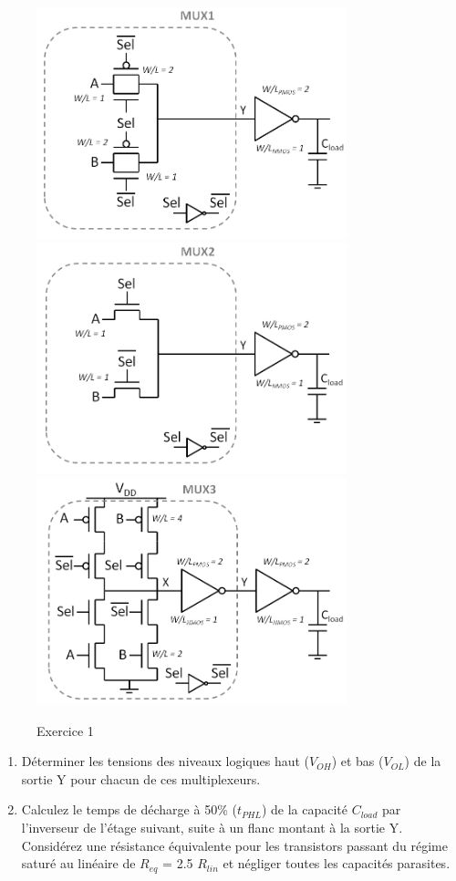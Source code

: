 \begin{figure}[!htbp]
   \centering
   \includegraphics[width=9cm]{figure/fig7-3-1.png}
	 \includegraphics[width=9cm]{figure/fig7-3-2.png}
	 \includegraphics[width=9cm]{figure/fig7-3-3.png}
   \caption{Exercice 1}
   \label{fig7-3}
\end{figure}

\begin{enumerate}
	\item Déterminer les tensions des niveaux logiques haut ($V_{OH}$) et bas ($V_{OL}$) de
	la sortie Y pour chacun de ces multiplexeurs.
	\item Calculez le temps de décharge à 50\% ($t_{PHL}$) de la capacité $C_{load}$ par
	l'inverseur de l'étage suivant, suite à un flanc montant à la sortie Y. Considérez une
	résistance équivalente pour les transistors passant du régime saturé au linéaire de
	$R_{eq}$ = 2.5 $R_{lin}$ et négliger toutes les capacités parasites.
\end{enumerate}